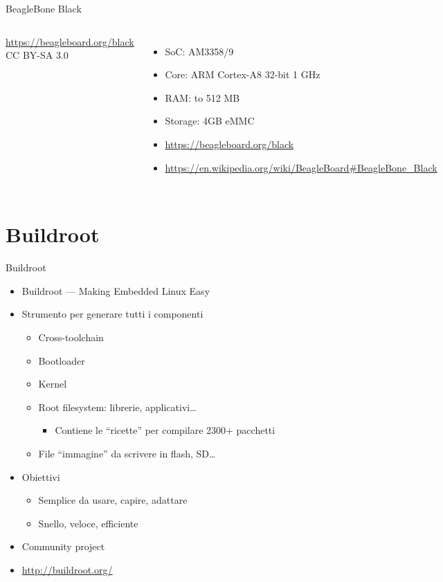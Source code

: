 \documentclass[xetex,table]{beamer}
\begin{document}
\begin{frame}{BeagleBone Black}
\begin{columns}
    {\tiny
      \url{https://beagleboard.org/black}\\
      CC BY-SA 3.0}
    \begin{itemize}
    \item SoC: AM3358/9
    \item Core: ARM Cortex-A8 32-bit 1 GHz
    \item RAM: to 512 MB
    \item Storage: 4GB eMMC
    \item \url{https://beagleboard.org/black}
    \item \url{https://en.wikipedia.org/wiki/BeagleBoard\#BeagleBone_Black}
    \end{itemize}
  \end{columns}
\end{frame}

\section{Buildroot}

\begin{frame}{Buildroot}
  \begin{itemize}
  \item Buildroot --- Making Embedded Linux Easy
  \pause\item Strumento per generare tutti i componenti
    \begin{itemize}
    \item Cross-toolchain
    \item Bootloader
    \item Kernel
    \item Root filesystem: librerie, applicativi\ldots
      \begin{itemize}
      \item Contiene le ``ricette'' per compilare 2300+ pacchetti
      \end{itemize}
    \item File ``immagine'' da scrivere in flash, SD\ldots
    \end{itemize}
  \pause\item Obiettivi
    \begin{itemize}
    \item Semplice da usare, capire, adattare
    \item Snello, veloce, efficiente
    \end{itemize}
  \pause\item Community project
  \pause\item \url{http://buildroot.org/}
  \end{itemize}
\end{frame}
\end{document}
